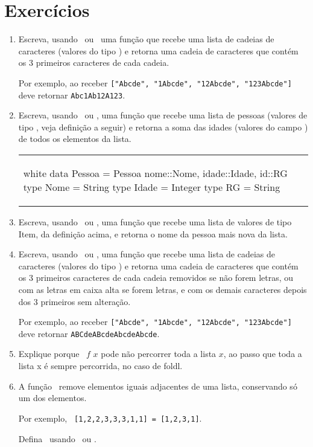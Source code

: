 \section{Exercícios}


\begin{enumerate}

\item Escreva, usando \foldl\ ou \foldr\, uma função que recebe uma
  lista de cadeias de caracteres (valores do tipo \String) e retorna
  uma cadeia de caracteres que contém os 3 primeiros caracteres de
  cada cadeia.

  Por exemplo, ao receber {\tt ["Abcde", "1Abcde", "12Abcde", "123Abcde"]}
  deve retornar {\tt {}Abc1Ab12A123}.

\item Escreva, usando \foldr\ ou \foldl, uma função que recebe uma
  lista de pessoas (valores de tipo \Pessoa, veja definição a seguir)
  e retorna a soma das idades (valores do campo \idade) de todos os
  elementos da lista.

\begin{center}
\begin{tabular}{l}
\begin{alg}{.5\textwidth}{white}
   data Pessoa = Pessoa {nome::Nome, idade::Idade, id::RG}
   type Nome   = String
   type Idade  = Integer
   type RG     = String
\end{alg}
\end{tabular}
\end{center}

\item Escreva, usando \foldr\ ou \foldl, uma função que recebe uma
  lista de valores de tipo Item, da definição acima, e retorna o nome
  da pessoa mais nova da lista.

\item Escreva, usando \foldl\ ou \foldr, uma função que recebe uma
  lista de cadeias de caracteres (valores do tipo \String) e retorna
  uma cadeia de caracteres que contém os 3 primeiros caracteres de
  cada cadeia removidos se não forem letras, ou com as letras em caixa
  alta se forem letras, e com os demais caracteres depois dos 3
  primeiros sem alteração.

  Por exemplo, ao receber {\tt ["Abcde", "1Abcde", "12Abcde", "123Abcde"]}
  deve retornar {\tt {}ABCdeABcdeAbcdeAbcde}.

\item Explique porque \foldr\ $f$ $x$ pode não percorrer toda a lista
  $x$, ao passo que toda a lista x é sempre percorrida, no caso de
  foldl.

\item A função \remdups\ remove elementos iguais adjacentes de uma
  lista, conservando só um dos elementos.

   Por exemplo, {\tt \remdups\ [1,2,2,3,3,3,1,1] = [1,2,3,1]}.

   Defina \remdups\ usando \foldr\ ou \foldl. 

\end{enumerate}

%
